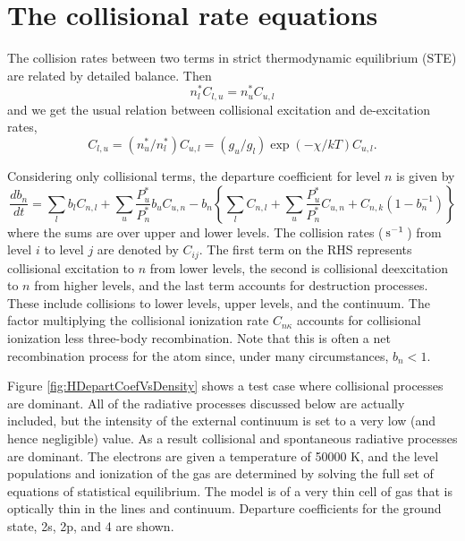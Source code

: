 \section{The collisional rate equations}

The collision rates between two terms in strict
thermodynamic equilibrium (STE) are related by detailed
balance.  Then
\begin{equation}
n_l^*{C_{l,u}} = n_u^*{C_{u,l}}
\end{equation}
and we get the usual relation between collisional excitation and
de-excitation rates,
\begin{equation}
{C_{l,u}} = \left( {n_u^*/n_l^*} \right){C_{u,l}} = \left( {{g_u}/{g_l}}
\right)\exp \left( { - \chi /kT} \right){C_{u,l}}.
\end{equation}

Considering only collisional terms, the departure coefficient for level
$n$ is given by
\begin{equation}
\frac{{d{b_n}}}{{dt}} = \sum\limits_l {{b_l}{C_{n,l}} + \sum\limits_u
{\frac{{P_u^*}}{{P_n^*}}{b_u}{C_{u,n}} - {b_n}\left\{ {\sum\limits_l
{{C_{n,l}}}  + \sum\limits_u {\frac{{P_u^*}}{{P_n^*}}{C_{u,n}} +
{C_{n,k}}\left( {1 - b_n^{ - 1}} \right)} } \right\}} }
\end{equation}
where the sums are over upper and lower levels.
The collision rates
($\mbox{${\rm\thinspace s}^{-1}\,$}$)
from level $i$ to level $j$ are denoted by $C_{ij}$.
The first term on the RHS
represents collisional excitation to $n$ from lower levels, the second is
collisional deexcitation to $n$ from higher levels,
and the last term accounts
for destruction processes.
These include collisions to lower levels, upper
levels, and the continuum.
The factor multiplying the collisional ionization
rate $C_{n\kappa}$ accounts for collisional ionization less three-body recombination.
Note that this is often a net recombination process for the atom since,
under many circumstances, $b_n < 1$.

Figure \ref{fig:HDepartCoefVsDensity} shows a test case where collisional processes are dominant.
All of the radiative processes discussed below are actually included, but
the intensity of the external continuum is set to a very low (and hence
negligible) value.  As a result collisional and spontaneous radiative
processes are dominant.  The electrons are given a temperature of 50000
K, and the level populations and ionization of the gas are determined by
solving the full set of equations of statistical equilibrium.  The model
is of a very thin cell of gas that is optically thin in the lines and
continuum.  Departure coefficients for the ground state, 2s, 2p, and 4 are
shown.


